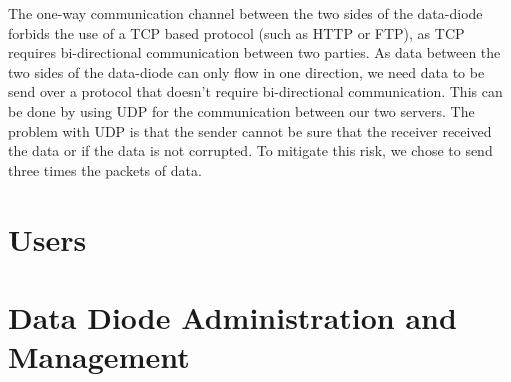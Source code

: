 \documentclass[a4paper,11pt]{article}
\begin{document}
The one-way communication channel between the two sides of the data-diode forbids the use of a TCP based protocol (such as HTTP or FTP), as TCP requires bi-directional communication between two parties. As data between the two sides of the data-diode can only flow in one direction, we need data to be send over a protocol that doesn't require bi-directional communication. This can be done by using UDP for the communication between our two servers. The problem with UDP is that the sender cannot be sure that the receiver received the data or if the data is not corrupted. To mitigate this risk, we chose to send three times the packets of data.


\section{Users}

\section{Data Diode Administration and Management}
\end{document}
